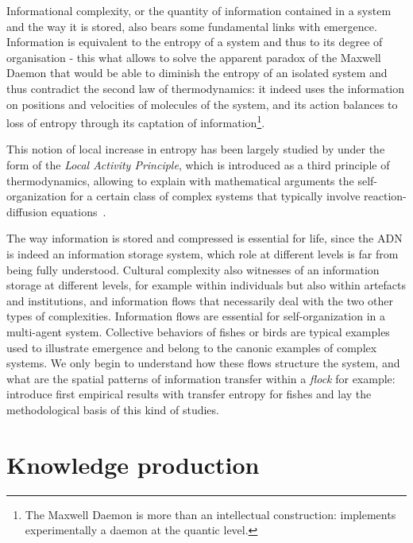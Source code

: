 Informational complexity, or the quantity of information contained in a system and the way it is stored, also bears some fundamental links with emergence. Information is equivalent to the entropy of a system and thus to its degree of organisation - this what allows to solve the apparent paradox of the Maxwell Daemon that would be able to diminish the entropy of an isolated system and thus contradict the second law of thermodynamics: it indeed uses the information on positions and velocities of molecules of the system, and its action balances to loss of entropy through its captation of information\footnote{The Maxwell Daemon is more than an intellectual construction: \cite{cottet2017observing} implements experimentally a daemon at the quantic level.}.

This notion of local increase in entropy has been largely studied by  under the form of the \emph{Local Activity Principle}, which is introduced as a third principle of thermodynamics, allowing to explain with mathematical arguments the self-organization for a certain class of complex systems that typically involve reaction-diffusion equations~\cite{mainzer2013local}.


The way information is stored and compressed is essential for life, since the ADN is indeed an information storage system, which role at different levels is far from being fully understood. Cultural complexity also witnesses of an information storage at different levels, for example within individuals but also within artefacts and institutions, and information flows that necessarily deal with the two other types of complexities. Information flows are essential for self-organization in a multi-agent system. Collective behaviors of fishes or birds are typical examples used to illustrate emergence and belong to the canonic examples of complex systems. We only begin to understand how these flows structure the system, and what are the spatial patterns of information transfer within a \emph{flock} for example: \cite{crosato2017informative} introduce first empirical results with transfer entropy for fishes and lay the methodological basis of this kind of studies. 



\section{Knowledge production}


